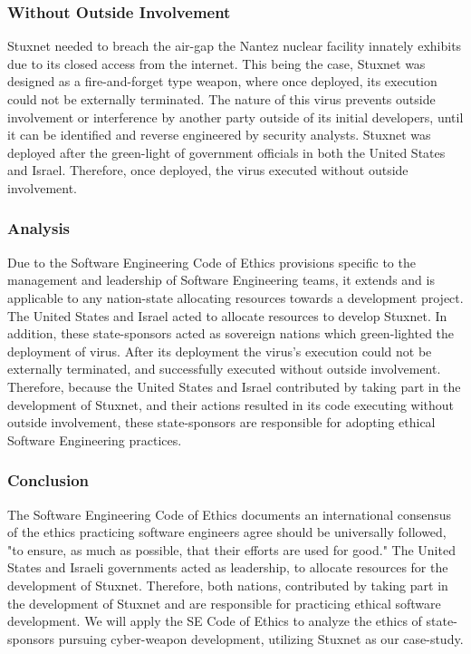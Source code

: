 \documentclass[12pt]{article}
\begin{document}
\begin{multicols}{2}
\subsubsection{Without Outside Involvement}

Stuxnet needed to breach the air-gap the Nantez nuclear facility innately exhibits due to its closed access from the internet. This being the case, Stuxnet was designed as a fire-and-forget type weapon, where once deployed, its execution could not be externally terminated.\cite{stuxnetFireandForget} The nature of this virus prevents outside involvement or interference by another party outside of its initial developers, until it can be identified and reverse engineered by security analysts. Stuxnet was deployed after the green-light of government officials in both the United States and Israel. Therefore, once deployed, the virus executed without outside involvement.


\subsubsection{Analysis}
Due to the Software Engineering Code of Ethics provisions specific to the management and leadership of Software Engineering teams, it extends and is applicable to any nation-state allocating resources towards a development project.\cite{softwareEngineeringCodeOfEthics} The United States and Israel acted to allocate resources to  develop Stuxnet. In addition, these state-sponsors acted as sovereign nations which green-lighted the deployment of virus.\cite{theRealStoryOfStuxnet} After its deployment the virus's execution could not be externally terminated, and successfully executed without outside involvement.\cite{stuxnetFireandForget} Therefore, because the United States and Israel contributed by taking part in the development of Stuxnet, and their actions resulted in its code executing without outside involvement, these state-sponsors are responsible for adopting ethical Software Engineering practices.

\subsubsection{Conclusion}

The Software Engineering Code of Ethics documents an international consensus of the ethics practicing software engineers agree should be universally followed, "to ensure, as much as possible, that their efforts are used for good."\cite{softwareEngineeringCodeOfEthics} The United States and Israeli governments acted as leadership, to allocate resources for the development of Stuxnet. Therefore, both nations, contributed by taking part in the development of Stuxnet and are responsible for practicing ethical software development. We will apply the SE Code of Ethics to analyze the ethics of state-sponsors pursuing cyber-weapon development, utilizing Stuxnet as our case-study.



\end{multicols}
\end{document}

